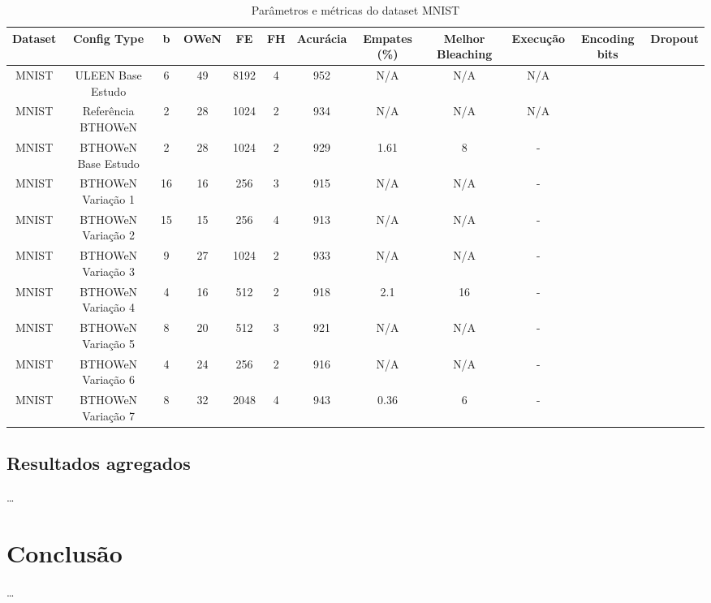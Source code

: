 \documentclass{article}
\begin{document}
\begin{longtable}{|c|c|c|c|c|c|c|c|c|c|c|c|}
\caption{Parâmetros e métricas do dataset MNIST} \\
\hline
\textbf{Dataset} & \textbf{Config Type} & \textbf{b} & \textbf{OWeN} & \textbf{FE} & \textbf{FH} & \textbf{Acurácia} & \textbf{Empates (\%)} & \textbf{Melhor Bleaching} & \textbf{Execução} & \textbf{Encoding bits} & \textbf{Dropout} \\
\hline
MNIST & ULEEN Base Estudo & 6 & 49 & 8192 & 4 & 952 & N/A & N/A & N/A &  &  \\
\hline
MNIST & Referência BTHOWeN & 2 & 28 & 1024 & 2 & 934 & N/A & N/A & N/A &  &  \\
\hline
MNIST & BTHOWeN Base Estudo & 2 & 28 & 1024 & 2 & 929 & 1.61 & 8 & - &  &  \\
\hline
MNIST & BTHOWeN Variação 1 & 16 & 16 & 256 & 3 & 915 & N/A & N/A & - &  &  \\
\hline
MNIST & BTHOWeN Variação 2 & 15 & 15 & 256 & 4 & 913 & N/A & N/A & - &  &  \\
\hline
MNIST & BTHOWeN Variação 3 & 9 & 27 & 1024 & 2 & 933 & N/A & N/A & - &  &  \\
\hline
MNIST & BTHOWeN Variação 4 & 4 & 16 & 512 & 2 & 918 & 2.1 & 16 & - &  &  \\
\hline
MNIST & BTHOWeN Variação 5 & 8 & 20 & 512 & 3 & 921 & N/A & N/A & - &  &  \\
\hline
MNIST & BTHOWeN Variação 6 & 4 & 24 & 256 & 2 & 916 & N/A & N/A & - &  &  \\
\hline
MNIST & BTHOWeN Variação 7 & 8 & 32 & 2048 & 4 & 943 & 0.36 & 6 & - &  &  \\
\hline
\end{longtable}

\subsection{Resultados agregados}

\ldots

\section{Conclusão}

\ldots



\end{document}
